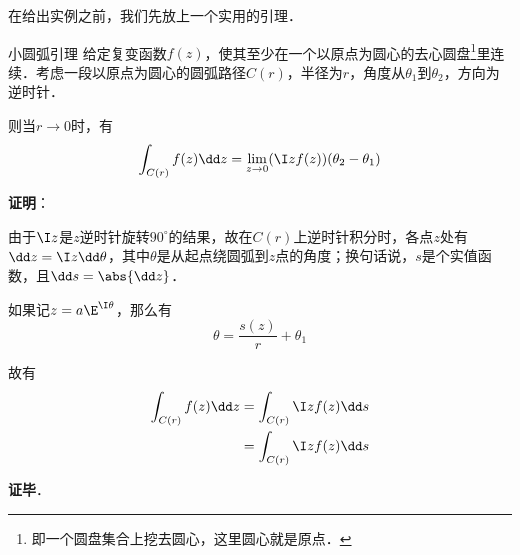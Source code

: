 在给出实例之前，我们先放上一个实用的引理．

\begin{lemma}{小圆弧引理}
给定复变函数$f(z)$，使其至少在一个以原点为圆心的去心圆盘\footnote{即一个圆盘集合上挖去圆心，这里圆心就是原点．}里连续．考虑一段以原点为圆心的圆弧路径$C(r)$，半径为$r$，角度从$\theta_1$到$\theta_2$，方向为逆时针．

则当$r\to 0$时，有
\begin{equation}
\int_{C(r)}f(z)\dd z=\lim\limits_{z\to 0}(\I zf(z))(\theta_2-\theta_1)
\end{equation}

\end{lemma}


\textbf{证明}：

由于$\I z$是$z$逆时针旋转$90^\circ$的结果，故在$C(r)$上逆时针积分时，各点$z$处有$\dd z=\I z\dd \theta$，其中$\theta$是从起点绕圆弧到$z$点的角度；换句话说，$s$是个实值函数，且$\dd s=\abs{\dd z}$．

如果记$z=a\E^{\I\theta}$，那么有
\begin{equation}
\theta=\frac{s(z)}{r}+\theta_1
\end{equation}

故有
\begin{equation}
\begin{aligned}
\int_{C(r)}f(z)\dd z&=\int_{C(r)}\I zf(z)\dd s\\
&=\int_{C(r)}\I zf(z)\dd s
\end{aligned}
\end{equation}

\textbf{证毕}．











